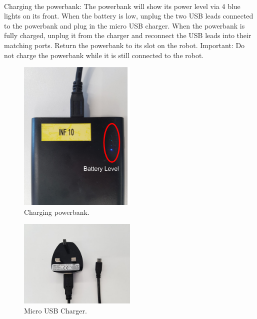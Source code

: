\documentclass[onecolumn]{IEEEtran}
\begin{document}
\  \\
Charging the powerbank:
\newline
The powerbank will show its power level via 4 blue lights on its front. When the battery is low, unplug the two USB leads connected to the powerbank and plug in the micro USB charger. When the powerbank is fully charged, unplug it from the charger and reconnect the USB leads into their matching ports. Return the powerbank to its slot on the robot.
Important: Do not charge the powerbank while it is still connected to the robot.
\begin{figure}[H]
    \begin{center}
    \includegraphics[width=0.5\textwidth]{power.png}
    \caption{Charging powerbank.}
    \label{fig: figure}
    \end{center}
\end{figure}
\begin{figure}[H]
    \begin{center}
    \includegraphics[width=0.5\textwidth]{usb.jpg}
    \caption{Micro USB Charger.}
    \label{fig: figure}
    \end{center}
\end{figure}
\end{document}
